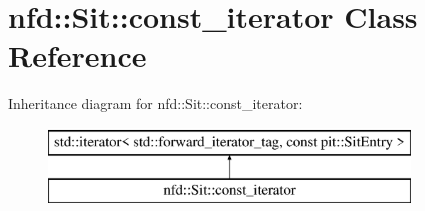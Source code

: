 \hypertarget{classnfd_1_1Sit_1_1const__iterator}{}\section{nfd\+:\+:Sit\+:\+:const\+\_\+iterator Class Reference}
\label{classnfd_1_1Sit_1_1const__iterator}
Inheritance diagram for nfd\+:\+:Sit\+:\+:const\+\_\+iterator\+:\begin{figure}[H]
\begin{center}
\leavevmode
\includegraphics[height=2.000000cm]{classnfd_1_1Sit_1_1const__iterator}
\end{center}
\end{figure}
